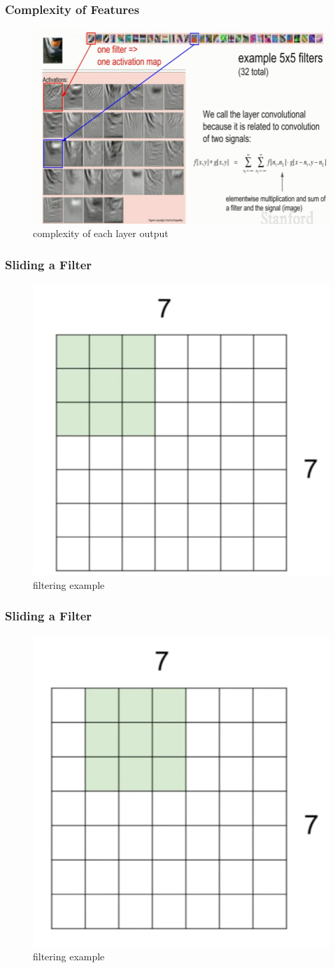 \documentclass{beamer}
\begin{document}
\begin{frame}
\frametitle{Complexity of Features}

\begin{figure}
	\includegraphics[width=.8\linewidth]{Pics/ex7.PNG}
	\caption{complexity of each layer output}
\end{figure}

\end{frame}

\begin{frame}
\frametitle{Sliding a Filter}
\begin{figure}
	\includegraphics[width=.5\linewidth]{Pics/clook.png}
	\caption{filtering example}
\end{figure}
\end{frame}

\begin{frame}
\frametitle{Sliding a Filter}
\begin{figure}
	\includegraphics[width=.5\linewidth]{Pics/clook2.png}
	\caption{filtering example}
\end{figure}
\end{frame}
\end{document}
